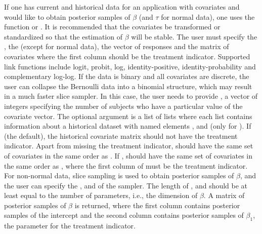 If one has current and historical data for an application with covariates and would like to obtain posterior samples of $\beta$ (and $\tau$ for normal data), one uses the function  or . It is recommended that the covariates be transformed or standardized so that the estimation of $\beta$ will be stable. The user must specify the , the  (except for normal data), the vector of responses  and the matrix of covariates  where the first column should be the treatment indicator. Supported link functions include logit, probit, log, identity-positive, identity-probability
and complementary log-log. If the data is binary and all covariates are discrete, the user can collapse the  Bernoulli data into a binomial structure, which may result in a much faster slice sampler. In this case, the user needs to provide , a vector of integers specifying the number of subjects who have a particular value of the covariate vector. The optional  argument is a list of lists where each list contains information about a historical dataset with named elements ,  and  (only for ). If  (the default), the historical covariate matrix  should not have the treatment indicator. Apart from missing the treatment indicator,  should have the same set of covariates in the same order as . If ,  should have the same set of covariates in the same order as , where the first column of  must be the treatment indicator. For non-normal data, slice sampling is used to obtain posterior samples of $\beta$, and the user can specify the ,  and  of the sampler. The length of ,  and  should be at least equal to the number of parameters, i.e., the dimension of $\beta$. A matrix of posterior samples of $\beta$ is returned, where the first column contains posterior samples of the intercept and the second column contains posterior samples of $\beta_1$, the parameter for the treatment indicator.

